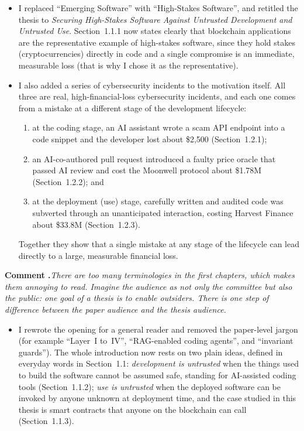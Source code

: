 \documentclass[11pt]{article}
\newcounter{commentcounter}
\newcommand{\comment}[1]{%
  \refstepcounter{commentcounter}%
  \begin{commentbox}
  \textbf{Comment \thecommentcounter.}\quad\itshape #1
  \end{commentbox}
}
\begin{document}
\begin{itemize}
  \item I replaced ``Emerging Software'' with ``High-Stakes Software'', and
  retitled the thesis to \emph{Securing High-Stakes Software Against Untrusted
  Development and Untrusted Use}. Section~1.1.1 now states clearly that
  blockchain applications are the representative example of high-stakes
  software, since they hold stakes (cryptocurrencies) directly in code and a
  single compromise is an immediate, measurable loss (that is why I chose it as
  the representative).

  \item I also added a series of cybersecurity incidents to the motivation
  itself. All three are real, high-financial-loss cybersecurity incidents, and
  each one comes from a mistake at a different stage of the development
  lifecycle:
  \begin{enumerate}[leftmargin=1.8em, itemsep=2pt, topsep=3pt]
    \item at the coding stage, an AI assistant wrote a scam API endpoint into a
    code snippet and the developer lost about \$2{,}500 (Section~1.2.1);
    \item an AI-co-authored pull request introduced a faulty price oracle that
    passed AI review and cost the Moonwell protocol about \$1.78M
    (Section~1.2.2); and
    \item at the deployment (use) stage, carefully written and audited code was
    subverted through an unanticipated interaction, costing Harvest Finance
    about \$33.8M (Section~1.2.3).
  \end{enumerate}
  Together they show that a single mistake at any stage of the lifecycle can
  lead directly to a large, measurable financial loss.
\end{itemize}

\comment{There are too many terminologies in the first chapters, which makes
them annoying to read. Imagine the audience as not only the committee but also
the public: one goal of a thesis is to enable outsiders. There is one step of
difference between the paper audience and the thesis audience.}

\begin{itemize}
  \item I rewrote the opening for a general reader and removed the paper-level
  jargon (for example ``Layer~I to~IV'', ``RAG-enabled coding agents'', and
  ``invariant guards''). The whole introduction now rests on two plain ideas,
  defined in everyday words in Section~1.1: \emph{development is untrusted} when
  the things used to build the software cannot be assumed safe, standing for
  AI-assisted coding tools (Section~1.1.2); \emph{use is untrusted} when the
  deployed software can be invoked by anyone unknown at deployment time, and
  the case studied in this thesis is smart contracts that anyone on the
  blockchain can call (Section~1.1.3).
\end{itemize}
\end{document}
